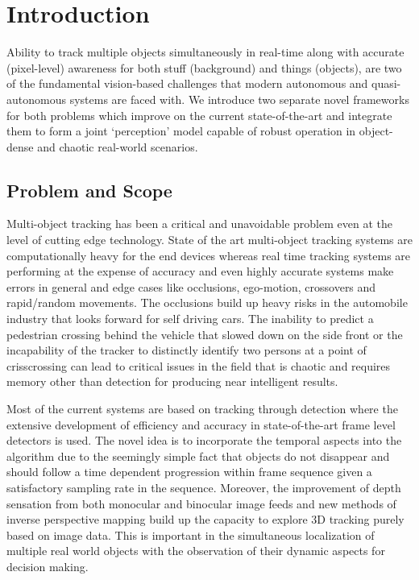 \chapter{Introduction}

Ability to track multiple objects simultaneously in real-time along with accurate (pixel-level) awareness for both stuff (background) and things (objects), are two of the fundamental vision-based challenges that modern autonomous and quasi-autonomous systems are faced with. We introduce two separate novel frameworks for both problems which improve on the current state-of-the-art and integrate them to form a joint ‘perception’ model capable of robust operation in object-dense and chaotic real-world scenarios.


\section{Problem and Scope}



Multi-object tracking has been a critical and unavoidable problem even at the level of cutting edge technology. State of the art multi-object tracking systems are computationally heavy for the end devices whereas real time tracking systems are performing at the expense of accuracy and even highly accurate systems \cite{DeepSiam:deepSort} make errors in general and edge cases like occlusions, ego-motion, crossovers and rapid/random movements. The occlusions build up heavy risks in the automobile industry that looks forward for self driving cars. The inability to predict a pedestrian crossing behind the vehicle that slowed down on the side front or the incapability of the tracker to distinctly identify two persons at a point of crisscrossing can lead to critical issues in the field that is chaotic and requires memory other than detection for producing near intelligent results.

Most of the current systems are based on tracking through detection where the extensive development of efficiency and accuracy in state-of-the-art frame level detectors is used. The novel idea is to incorporate the temporal aspects into the algorithm due to the seemingly simple fact that objects do not disappear and should follow a time dependent progression within frame sequence given a satisfactory sampling rate in the sequence. Moreover, the improvement of depth sensation from both monocular and binocular image feeds \cite{DeepSiam:triangulation} and new methods of inverse perspective mapping  \cite{DeepSiam:perspective} build up the capacity to explore 3D tracking purely based on image data. This is important in the simultaneous localization of multiple real world objects with the observation of their dynamic aspects for decision making. 


